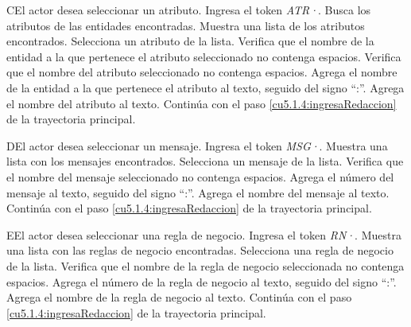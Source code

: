  \begin{UCtrayectoriaA}{C}{El actor desea seleccionar un atributo.}
 	\UCpaso[\UCactor] Ingresa el token {\it ATR·}.
  	\UCpaso[\UCsist] Busca los atributos de las entidades encontradas.
  	\UCpaso[\UCsist] Muestra una lista de los atributos encontrados.
 	\UCpaso[\UCactor] Selecciona un atributo de la lista.
  	\UCpaso[\UCsist] Verifica que el nombre de la entidad a la que pertenece el atributo seleccionado no contenga espacios. 
  	\UCpaso[\UCsist] Verifica que el nombre del atributo seleccionado no contenga espacios. 
  	\UCpaso[\UCsist] Agrega el nombre de la entidad a la que pertenece el atributo al texto, seguido del signo ``:''.
  	\UCpaso[\UCsist] Agrega el nombre del atributo al texto.
    \UCpaso[] Continúa con el paso \ref{cu5.1.4:ingresaRedaccion} de la trayectoria principal.
 \end{UCtrayectoriaA}
 \begin{UCtrayectoriaA}{D}{El actor desea seleccionar un mensaje.}
 	 \UCpaso[\UCactor] Ingresa el token {\it MSG·}.	
 	\UCpaso[\UCsist] Muestra una lista con los mensajes encontrados.
 	\UCpaso[\UCactor] Selecciona un mensaje de la lista.
  	\UCpaso[\UCsist] Verifica que el nombre del mensaje seleccionado no contenga espacios. 
  	\UCpaso[\UCsist] Agrega el número del mensaje al texto, seguido del signo ``:''.
  	\UCpaso[\UCsist] Agrega el nombre del mensaje al texto.
    \UCpaso[] Continúa con el paso \ref{cu5.1.4:ingresaRedaccion} de la trayectoria principal.
 \end{UCtrayectoriaA}
 \begin{UCtrayectoriaA}{E}{El actor desea seleccionar una regla de negocio.}
 	\UCpaso[\UCactor] Ingresa el token {\it RN·}.	
 	\UCpaso[\UCsist] Muestra una lista con las reglas de negocio encontradas.
 	\UCpaso[\UCactor] Selecciona una regla de negocio de la lista.
  	\UCpaso[\UCsist] Verifica que el nombre de la regla de negocio seleccionada no contenga espacios. 
  	\UCpaso[\UCsist] Agrega el número de la regla de negocio al texto, seguido del signo ``:''.
  	\UCpaso[\UCsist] Agrega el nombre de la regla de negocio al texto.
    \UCpaso[] Continúa con el paso \ref{cu5.1.4:ingresaRedaccion} de la trayectoria principal.
 \end{UCtrayectoriaA}
